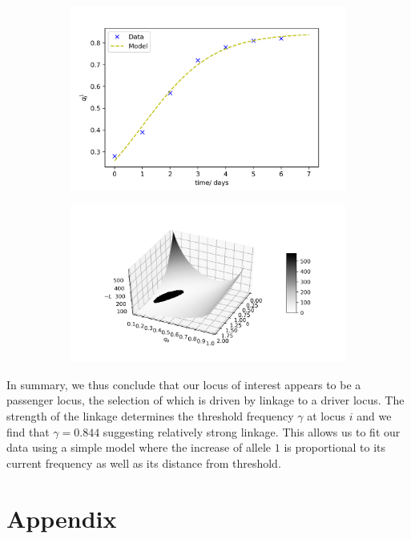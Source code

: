 \documentclass{article}
\begin{document}
\begin{figure}[h]
	\centering
	\begin{subfigure}[t]{0.45\linewidth}
		\centering
		\includegraphics[width = 1.0\linewidth, trim={10 5 30 30}, clip=true]{fit_modelpas.png}
		\label{fig:fittedpas}	
	\end{subfigure}%
	\hspace{0.05\linewidth}
	\begin{subfigure}[t]{0.45\linewidth}
		\centering
		\includegraphics[width = 1.0\linewidth, trim={90 40 60 60}, clip=true]{Lsurfpas.png}
		\label{fig:Lsurfpas}	
	\end{subfigure}%
\end{figure}

In summary, we thus conclude that our locus of interest appears to be a passenger locus, the selection of which is driven by linkage to a driver locus. The strength of the linkage determines the threshold frequency $\gamma$ at locus $i$ and we find that $\gamma = 0.844$ suggesting relatively strong linkage. This allows us to fit our data using a simple model where the increase of allele $1$ is proportional to its current frequency as well as its distance from threshold.

\newpage

\section*{Appendix}


\end{document}
